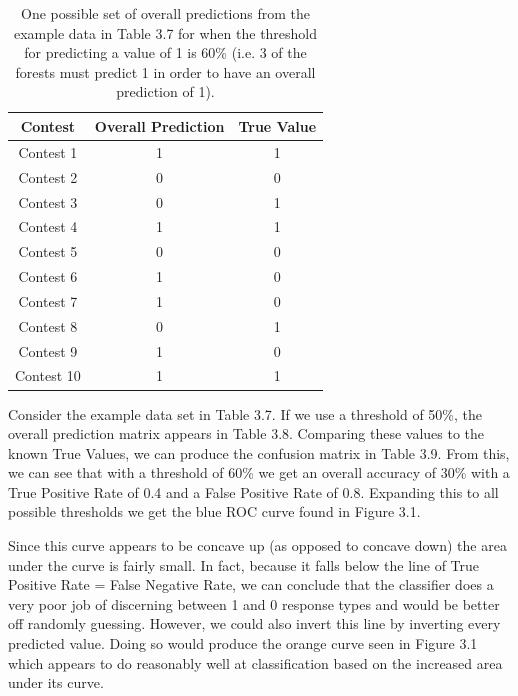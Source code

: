 \begin{table}
\begin{center}
\begin{tabular}{| c | c | c |}
\hline
 \textbf{Contest} & \textbf{Overall Prediction} & \textbf{True Value}\\ 
 \hline
 Contest 1 & 1 & 1 \\  
 \hline
 Contest 2 & 0 & 0 \\
 \hline
 Contest 3 & 0 & 1 \\
 \hline
 Contest 4 & 1 & 1 \\
 \hline
 Contest 5 & 0 & 0 \\
 \hline
 Contest 6 & 1 & 0 \\
 \hline
 Contest 7 & 1 & 0 \\
 \hline
 Contest 8 & 0 & 1 \\
 \hline
 Contest 9 & 1 & 0 \\
 \hline
 Contest 10 & 1 & 1 \\
 \hline
\end{tabular}
\caption[Example of Final Predictions Against True Outcomes]{One possible set of overall predictions from the example data in Table 3.7 for when the threshold for predicting a value of 1 is 60\% (i.e. 3 of the forests must predict 1 in order to have an overall prediction of 1).}
\end{center}
\end{table}

Consider the example data set in Table 3.7. If we use a threshold of 50\%, the overall prediction matrix appears in Table 3.8. Comparing these values to the known True Values, we can produce the confusion matrix in Table 3.9. From this, we can see that with a threshold of 60\% we get an overall accuracy of 30\% with a True Positive Rate of 0.4 and a False Positive Rate of 0.8. Expanding this to all possible thresholds we get the blue ROC curve found in Figure 3.1.

Since this curve appears to be concave up (as opposed to concave down) the area under the curve is fairly small. In fact, because it falls below the line of True Positive Rate = False Negative Rate, we can conclude that the classifier does a very poor job of discerning between 1 and 0 response types and would be better off randomly guessing. However, we could also invert this line by inverting every predicted value. Doing so would produce the orange curve seen in Figure 3.1 which appears to do reasonably well at classification based on the increased area under its curve.

